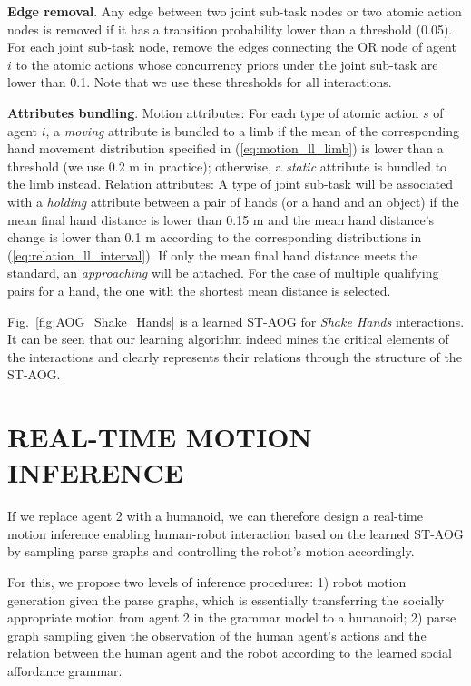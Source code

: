 \documentclass[letterpaper, 10 pt, conference]{ieeeconf}  %
\begin{document}
 \textbf{Edge removal}. Any edge between two joint sub-task nodes or two atomic action nodes is removed if it has a transition probability lower than a threshold (0.05). For each joint sub-task node, remove the edges connecting the OR node of agent $i$ to the atomic actions whose concurrency priors under the joint sub-task are lower than 0.1. Note that we use these thresholds for all interactions.
 
 \textbf{Attributes bundling}. Motion attributes: For each type of atomic action $s$ of agent $i$, a \textit{moving} attribute is bundled to a limb if the mean of the corresponding hand movement distribution specified in (\ref{eq:motion_ll_limb}) is lower than a threshold (we use 0.2 m in practice); otherwise, a \textit{static} attribute is bundled to the limb instead. Relation attributes: A type of joint sub-task will be associated with a \textit{holding} attribute between a pair of hands (or a hand and an object) if the mean final hand distance is lower than 0.15 m and the mean hand distance's change is lower than 0.1 m according to the corresponding distributions in (\ref{eq:relation_ll_interval}). If only the mean final hand distance meets the standard, an \textit{approaching} will be attached. For the case of multiple qualifying pairs for a hand, the one with the shortest mean distance is selected.

Fig.~\ref{fig:AOG_Shake_Hands} is a learned ST-AOG for \textit{Shake Hands} interactions. It can be seen that our learning algorithm indeed mines the critical elements of the interactions and clearly represents their relations through the structure of the ST-AOG.





\section{REAL-TIME MOTION INFERENCE}

If we replace agent 2 with a humanoid, we can therefore design a real-time motion inference enabling human-robot interaction based on the learned ST-AOG by sampling parse graphs and controlling the robot's motion accordingly.

For this, we propose two levels of inference procedures: 1) robot motion generation given the parse graphs, which is essentially transferring the socially appropriate motion from agent 2 in the grammar model to a humanoid; 2) parse graph sampling given the observation of the human agent's actions and the relation between the human agent and the robot according to the learned social affordance grammar.
\end{document}
